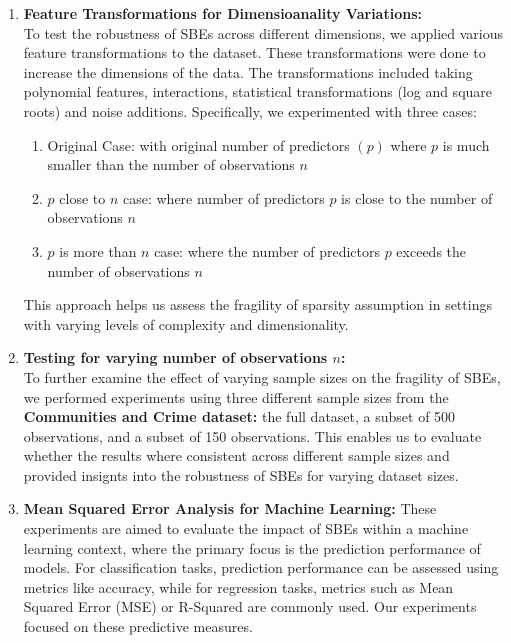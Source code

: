 \begin{enumerate}
    \item \textbf{Feature Transformations for Dimensioanality Variations:}\\
    To test the robustness of SBEs across different dimensions, we applied various feature transformations to the dataset.  These transformations were done to increase the dimensions of the data. The  transformations included taking polynomial features, interactions, statistical transformations (log and square roots) and noise additions. Specifically, we experimented with three cases: 
    \begin{enumerate}
        \item Original Case: with original number of predictors $(p)$ where $p$ is much smaller than the number of observations $n$
        \item $p$ close to $n$ case: where number of predictors $p$ is close to the number of observations $n$
        \item $p$ is more than $n$ case: where the number of predictors $p$ exceeds the number of observations $n$
    \end{enumerate}
    This approach helps us assess the fragility of sparsity assumption in settings with varying levels of complexity and dimensionality.

    \item \textbf{Testing for varying number of observations $n$:}\\
    To further examine the effect of varying sample sizes on the fragility of SBEs, we performed experiments using three different sample sizes from the \textbf{Communities and Crime dataset:} the full dataset, a subset of 500 observations, and a subset of 150 observations. This enables us to evaluate whether the results where consistent across different sample sizes and provided insignts into the robustness of SBEs for varying dataset sizes. 

    \item \textbf{Mean Squared Error Analysis for Machine Learning:}
    These experiments are aimed to evaluate the impact of SBEs within a machine learning context, where the primary focus is the prediction performance of models. For classification tasks, prediction performance can be assessed using metrics like accuracy, while for regression tasks, metrics such as Mean Squared Error (MSE) or R-Squared are commonly used. Our experiments focused on these predictive measures.
    

\end{enumerate}
